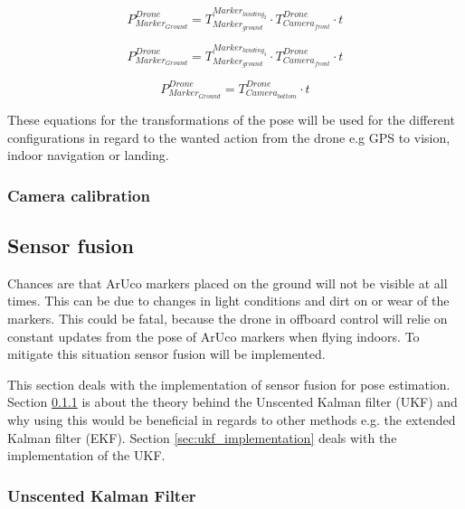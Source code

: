 \documentclass[../Head/report.tex]{subfiles}
\begin{document}
\begin{equation}
	P^{Drone}_{Marker_{Ground}} = T^{Marker_{landing_2}}_{Marker_{ground}} \cdot T^{Drone}_{Camera_{front}} \cdot t
	\label{eq:translation_drone2ground_landing2} 
\end{equation} 

\begin{equation}
	P^{Drone}_{Marker_{Ground}} = T^{Marker_{landing_3}}_{Marker_{ground}} \cdot T^{Drone}_{Camera_{front}} \cdot t
	\label{eq:translation_drone2ground_landing3}   
\end{equation} 

\begin{equation}
	P^{Drone}_{Marker_{Ground}} = T^{Drone}_{Camera_{bottom}} \cdot t 
	\label{eq:translation_drone2ground}  
\end{equation}

These equations for the transformations of the pose will be used for the different configurations in regard to the wanted action from the drone e.g GPS to vision, indoor navigation or landing.    

\subsubsection{Camera calibration}

\subsection{Sensor fusion}
\label{sec:sensor_fusion}
Chances are that ArUco markers placed on the ground will not be visible at all times. This can be due to changes in light conditions and dirt on or wear of the markers. This could be fatal, because the drone in offboard control will relie on constant updates from the pose of ArUco markers when flying indoors. To mitigate this situation sensor fusion will be implemented. 

This section deals with the implementation of sensor fusion for pose estimation. Section \ref{sec:ukf} is about the theory behind the Unscented Kalman filter (UKF) and why using this would be beneficial in regards to other methods e.g. the extended Kalman filter (EKF). Section \ref{sec:ukf_implementation} deals with the implementation of the UKF.   

\subsubsection{Unscented Kalman Filter}
\label{sec:ukf}
\end{document}
